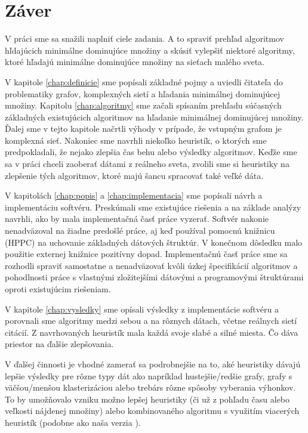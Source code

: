 \cleardoublepage
{}
{}
\chapter*{Záver}\label{chap:zaver}

V práci sme sa snažili naplniť ciele zadania. A to spraviť prehľad algoritmov 
hľdajúcich minimálne dominujúce množiny a skúsiť vylepšiť niektoré algoritmy, 
ktoré hľadajú minimálne dominujúce množiny na sieťach malého sveta. 

V kapitole \ref{chap:definicie} sme popísali základné pojmy a uviedli čitateľa 
do problematiky grafov, komplexných sietí a hľadania minimálnej dominujúcej 
množiny. Kapitolu \ref{chap:algoritmy} sme začali spísaním prehľadu súčasných 
základných existujúcich algoritmov na hľadanie minimálnej dominujúcej množiny. 
Ďalej sme v tejto kapitole načrtli výhody v prípade, že vstupným grafom je 
komplexná sieť. Nakoniec sme navrhli niekoľko heuristík, o ktorých sme 
predpokladali, že nejako zlepšia čas behu alebo výsledky algoritmov. Keďže 
sme sa v práci chceli zaoberať dátami z reálneho sveta, zvolili sme si 
heuristiky na zlepšenie tých algoritmov, ktoré majú šancu spracovať také veľké 
dáta.

V kapitolách \ref{chap:popis} a \ref{chap:implementacia} sme popísali návrh a 
implementáciu softvéru. Preskúmali sme existujúce riešenia a na základe analýzy 
navrhli, ako by mala implementačná časť práce vyzerať.
Softvér nakonie nenadväzoval na žiadne predošlé práce, aj keď 
používal pomocnú knižnicu (HPPC) na uchovanie základných dátových štruktúr. 
V konečnom dôsledku malo použitie externej knižnice pozitívny dopad. 
Implementačnú časť práce sme sa rozhodli spraviť samostatne a nenadväzovať 
kvôli úzkej špecifikácií algoritmov a pohodlnosti práce s vlastnými 
zložitejšími dátovými a programovými štruktúrami oproti existujúcim riešeniam.

V kapitole \ref{chap:vysledky} sme opísali výsledky z implementácie softvéru a 
porovnali sme algoritmy medzi sebou a na rôznych dátach, včetne reálnych sietí 
citácií. Z navrhovaných heuristík mala každá svoje slabé a silné miesta. 
Čo dáva priestor na ďalšie zlepšovania. 

V ďalšej činnosti je vhodné zamerať sa podrobnejšie na to, aké heuristiky 
dávajú lepšie výsledky pre rôzne typy dát ako napríklad hustejšie/redšie grafy, 
grafy s väčšou/menšou klasterizáciou alebo trebárs rôzne spôsoby vyberania 
výhonkov. To by umožňovalo vzniku možno lepšej heuristiky (či už z pohľadu času 
alebo veľkosti nájdenej množiny) alebo kombinovaného algoritmu s využitím 
viacerých heuristík (podobne ako naša verzia ).


